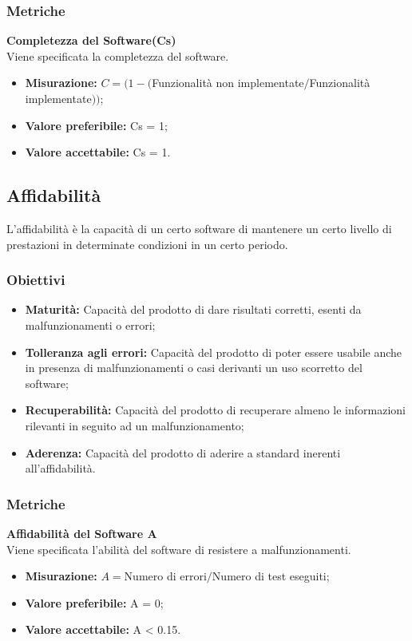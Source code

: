 \subsubsection{Metriche}
\textbf{Completezza del Software(Cs)}\\
Viene specificata la completezza del software.
\begin{itemize}
	\item \textbf{Misurazione:} $C = (1-($Funzionalità non implementate$ / $Funzionalità implementate$))$;
	\item \textbf{Valore preferibile:} Cs = 1;
	\item \textbf{Valore accettabile:} Cs = 1.
\end{itemize}
\pagebreak
\subsection{Affidabilità}
L'affidabilità è la capacità di un certo software di mantenere un certo livello di prestazioni in determinate condizioni in un certo periodo.
\subsubsection{Obiettivi}
\begin{itemize}
	\item \textbf{Maturità:} Capacità del prodotto di dare risultati corretti, esenti da malfunzionamenti o errori;
	\item \textbf{Tolleranza agli errori:} Capacità del prodotto di poter essere usabile anche in presenza di malfunzionamenti o casi derivanti un uso scorretto del software;
	\item \textbf{Recuperabilità:} Capacità del prodotto di recuperare almeno le informazioni rilevanti in seguito ad un malfunzionamento;
	\item \textbf{Aderenza:} Capacità del prodotto di aderire a standard inerenti all'affidabilità.
\end{itemize}
\subsubsection{Metriche}
\textbf{Affidabilità del Software A}\\
Viene specificata l'abilità del software di resistere a malfunzionamenti.
\begin{itemize}
	\item \textbf{Misurazione:} $A = $Numero di errori$ / $Numero di test eseguiti;
	\item \textbf{Valore preferibile:} A = 0;
	\item \textbf{Valore accettabile:} A < 0.15.
\end{itemize}

